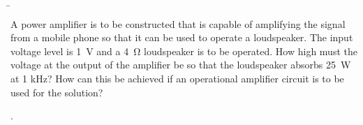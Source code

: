 \b{\begin{frame}
        A power amplifier is to be constructed that is capable of amplifying the signal from a mobile phone so that it can be used to operate a loudspeaker.
        The input voltage level is 1~V and a 4~$\mathrm{\Omega}$ loudspeaker is to be operated. 
        How high must the voltage at the output of the amplifier be so that the loudspeaker absorbs 25~W at 1 kHz?
        How can this be achieved if an operational amplifier circuit is to be used for the solution? \par        
        .
\end{frame}}


